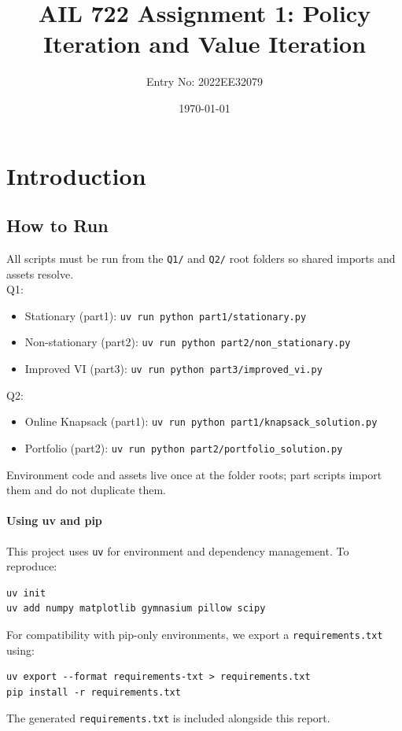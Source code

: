 \documentclass[12pt]{article}
\title{AIL 722 Assignment 1: Policy Iteration and Value Iteration}
\author{Entry No: 2022EE32079}
\date{\today}
\begin{document}
\maketitle

\tableofcontents
\clearpage

\section{Introduction}
\subsection*{How to Run}
All scripts must be run from the \texttt{Q1/} and \texttt{Q2/} root folders so shared imports and assets resolve.
\\Q1:
\begin{itemize}
  \item Stationary (part1): \texttt{uv run python part1/stationary.py}
  \item Non-stationary (part2): \texttt{uv run python part2/non\_stationary.py}
  \item Improved VI (part3): \texttt{uv run python part3/improved\_vi.py}
\end{itemize}
Q2:
\begin{itemize}
  \item Online Knapsack (part1): \texttt{uv run python part1/knapsack\_solution.py}
  \item Portfolio (part2): \texttt{uv run python part2/portfolio\_solution.py}
\end{itemize}
Environment code and assets live once at the folder roots; part scripts import them and do not duplicate them.

\paragraph{Using uv and pip}
This project uses \texttt{uv} for environment and dependency management. To reproduce:
\begin{verbatim}
uv init
uv add numpy matplotlib gymnasium pillow scipy
\end{verbatim}
For compatibility with pip-only environments, we export a \texttt{requirements.txt} using:
\begin{verbatim}
uv export --format requirements-txt > requirements.txt
pip install -r requirements.txt
\end{verbatim}
The generated \texttt{requirements.txt} is included alongside this report.
\end{document}
